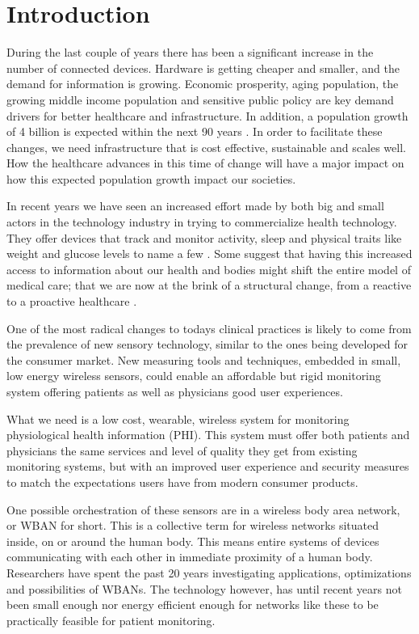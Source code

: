 \section{Introduction} %
\label{sec:introduction}

During the last couple of years there has been a significant increase in the number of connected devices. Hardware is getting cheaper and smaller, and the demand for information is growing. Economic prosperity, aging population, the growing middle income population and sensitive public policy are key demand drivers for better healthcare and infrastructure. In addition, a population growth of 4 billion is expected within the next 90 years \cite{WPP2015_Methodology}. In order to facilitate these changes, we need infrastructure that is cost effective, sustainable and scales well. How the healthcare advances in this time of change will have a major impact on how this expected population growth impact our societies. 

In recent years we have seen an increased effort made by both big and small actors in the technology industry in trying to commercialize health technology. They offer devices that track and monitor activity, sleep and physical traits like weight and glucose levels to name a few \cite{fitbit, fitbit_scale_6}. Some suggest that having this increased access to information about our health and bodies might shift the entire model of medical care; that we are now at the brink of a structural change, from a reactive to a proactive healthcare \cite{lynnechou_7, helsit_kari_8, johnmaeda_9, deloitte_healthcare3_0_10}.

One of the most radical changes to todays clinical practices is likely to come from the prevalence of new sensory technology, similar to the ones being developed for the consumer market. New measuring tools and techniques, embedded in small, low energy wireless sensors, could enable an affordable but rigid monitoring system offering patients as well as physicians good user experiences. 

What we need is a low cost, wearable, wireless system for monitoring physiological health information (PHI). This system must offer both patients and physicians the same services and level of quality they get from existing monitoring systems, but with an improved user experience and security measures to match the expectations users have from modern  consumer products. 

One possible orchestration of these sensors are in a wireless body area network, or WBAN for short. This is a collective term for wireless networks situated inside, on or around the human body. This means entire systems of devices communicating with each other in immediate proximity of a human body. Researchers have spent the past 20 years investigating applications, optimizations and possibilities of WBANs. The technology however, has until recent years not been small enough nor energy efficient enough for networks like these to be practically feasible for patient monitoring.

